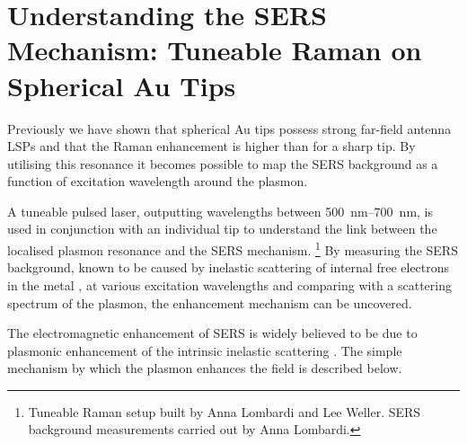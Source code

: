 \documentclass{article}
\begin{document}
\section{Understanding the SERS Mechanism: Tuneable Raman on Spherical Au Tips}

Previously we have shown that spherical Au tips possess strong far-field antenna LSPs and that the Raman enhancement is higher than for a sharp tip. By utilising this resonance it becomes possible to map the SERS background as a function of excitation wavelength around the plasmon.

A tuneable pulsed laser, outputting wavelengths between \SIrange{500}{700}{nm}, is used in conjunction with an individual tip to understand the link between the localised plasmon resonance and the SERS mechanism.%
\footnote{Tuneable Raman setup built by Anna Lombardi and Lee Weller. SERS background measurements carried out by Anna Lombardi.}
By measuring the SERS background, known to be caused by inelastic scattering of internal free electrons in the metal \cite{hugall2015}, at various excitation wavelengths and comparing with a scattering spectrum of the plasmon, the enhancement mechanism can be uncovered.

The electromagnetic enhancement of SERS is widely believed to be due to plasmonic enhancement of the intrinsic inelastic scattering \cite{}. The simple mechanism by which the plasmon enhances the field is described below.
\end{document}
